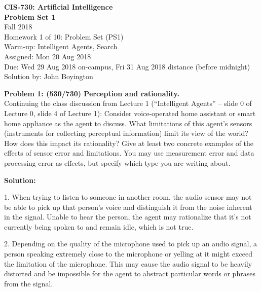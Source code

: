 \documentclass{amsart}
\theoremstyle{definition}
\begin{document}
\noindent
\LARGE{\textbf{CIS-730: Artificial Intelligence}} \\
\large
\noindent
\textbf{Problem Set 1} \\
Fall 2018 \\
Homework 1 of 10: Problem Set (PS1) \\
Warm-up: Intelligent Agents, Search \\
Assigned: Mon 20 Aug 2018 \\
Due: Wed 29 Aug 2018 on-campus, Fri 31 Aug 2018 distance (before midnight) \\
Solution by:  John Boyington \\
\newline
\bigskip



\noindent
\textbf{Problem 1: (530/730) Perception and rationality.} \\

Continuing the class discussion from Lecture 1 (“Intelligent Agents” – slide 0 of Lecture 0, slide 4 of Lecture 1):
Consider voice-operated home assistant or smart home appliance as the agent to discuss.
What limitations of this agent’s sensors (instruments for collecting perceptual information) limit its view of the world?
How does this impact its rationality? Give at least two concrete examples of the effects of sensor error and limitations.
You may use measurement error and data processing error as effects, but specify which type you are writing about.
\vspace{0.05\textheight}

\noindent
\textbf{Solution:}

1. When trying to listen to someone in another room, the audio sensor may not be able to pick up that person's voice and distinguish it from the noise inherent in the signal. Unable to hear the person, the agent may rationalize that it's not currently being spoken to and remain idle, which is not true.

2. Depending on the quality of the microphone used to pick up an audio signal, a person speaking extremely close to the microphone or yelling at it might exceed the limitation of the microphone. This may cause the audio signal to be heavily distorted and be impossible for the agent to abstract particular words or phrases from the signal.

\newpage
\end{document}
